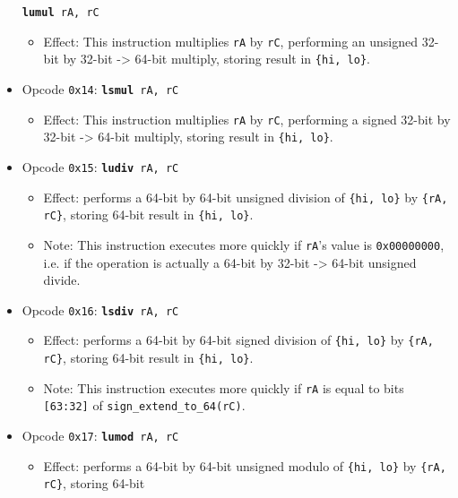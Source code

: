 \documentclass{article}
\begin{document}
\begin{itemize}
			\texttt{\textbf{lumul} rA, rC}
		\begin{itemize}
			\item Effect:  This instruction multiplies \texttt{rA} by
			\texttt{rC}, performing an unsigned 32-bit by 32-bit -> 64-bit
			multiply, storing result in \texttt{\{hi, lo\}}.
		\end{itemize}
		\item Opcode \texttt{0x14}:
			\texttt{\textbf{lsmul} rA, rC}
		\begin{itemize}
			\item Effect:  This instruction multiplies \texttt{rA} by
			\texttt{rC}, performing a signed 32-bit by 32-bit -> 64-bit
			multiply, storing result in \texttt{\{hi, lo\}}.
		\end{itemize}
		\item Opcode \texttt{0x15}:
			\texttt{\textbf{ludiv} rA, rC}
		\begin{itemize}
			\item Effect:  performs a 64-bit by 64-bit unsigned division of
			\texttt{\{hi, lo\}} by \texttt{\{rA, rC\}}, storing 64-bit
			result in \texttt{\{hi, lo\}}.
			\item Note:  This instruction executes more quickly if
			\texttt{rA}'s value is \texttt{0x00000000}, i.e. if the
			operation is actually a 64-bit by 32-bit -> 64-bit unsigned
			divide.
		\end{itemize}
		\item Opcode \texttt{0x16}:
			\texttt{\textbf{lsdiv} rA, rC}
		\begin{itemize}
			\item Effect:  performs a 64-bit by 64-bit signed division of
			\texttt{\{hi, lo\}} by \texttt{\{rA, rC\}}, storing 64-bit
			result in \texttt{\{hi, lo\}}.
			\item Note:  This instruction executes more quickly if
			\texttt{rA} is equal to bits \texttt{[63:32]} of
			\texttt{sign\_extend\_to\_64(rC)}.
		\end{itemize}
		\item Opcode \texttt{0x17}:
			\texttt{\textbf{lumod} rA, rC}
		\begin{itemize}
			\item Effect:  performs a 64-bit by 64-bit unsigned modulo of
			\texttt{\{hi, lo\}} by \texttt{\{rA, rC\}}, storing 64-bit

\end{itemize}
\end{itemize}
\end{document}

